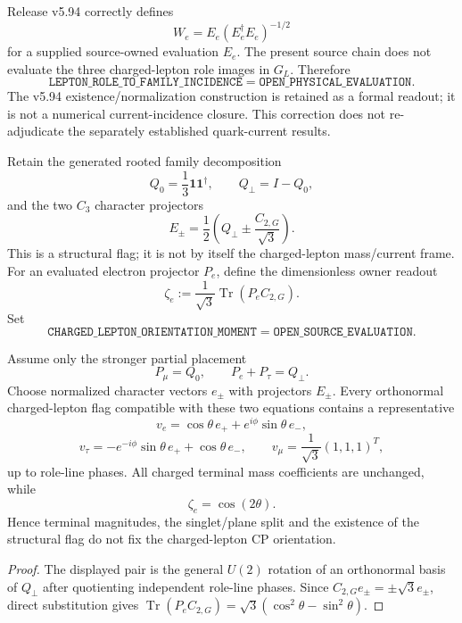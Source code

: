 \documentclass[12pt,a4paper]{article}
\begin{document}
\begin{corollary}
\label{p6:cor:v595-we-formal-open-evaluation}
Release v5.94 correctly defines
\[
 W_e=E_e(E_e^\dagger E_e)^{-1/2}
\]
for a supplied source-owned evaluation $E_e$.  The present source chain does
not evaluate the three charged-lepton role images in $G_L$.  Therefore
\[
 \boxed{
 \texttt{LEPTON\_ROLE\_TO\_FAMILY\_INCIDENCE}
 =\texttt{OPEN\_PHYSICAL\_EVALUATION}.}
\]
The v5.94 existence/normalization construction is retained as a formal
readout; it is not a numerical current-incidence closure.  This correction
does not re-adjudicate the separately established quark-current results.
\end{corollary}

\begin{definition}
\label{p6:def:v595-lepton-orientation-moment}
Retain the generated rooted family decomposition
\[
 Q_0=\frac13\mathbf1\mathbf1^\dagger,\qquad
 Q_\perp=I-Q_0,
\]
and the two $C_3$ character projectors
\[
 E_\pm=\frac12\left(Q_\perp\pm\frac{C_{2,G}}{\sqrt3}\right).
\]
This is a structural flag; it is not by itself the charged-lepton mass/current
frame.  For an evaluated electron projector $P_e$, define the dimensionless
owner readout
\[
 \boxed{\zeta_e:=\frac1{\sqrt3}\operatorname{Tr}(P_eC_{2,G}).}
\]
Set
\[
 \boxed{
 \texttt{CHARGED\_LEPTON\_ORIENTATION\_MOMENT}
 =\texttt{OPEN\_SOURCE\_EVALUATION}.}
\]
\end{definition}

\begin{theorem}
\label{p6:thm:v595-lepton-inplane-counterfamily}
Assume only the stronger partial placement
\[
 P_\mu=Q_0,\qquad P_e+P_\tau=Q_\perp.
\]
Choose normalized character vectors $e_\pm$ with projectors $E_\pm$.  Every
orthonormal charged-lepton flag compatible with these two equations contains
a representative
\[
 v_e=\cos\theta\,e_+ +e^{i\phi}\sin\theta\,e_-,
\]
\[
 v_\tau=-e^{-i\phi}\sin\theta\,e_+ +\cos\theta\,e_-,
\qquad
 v_\mu=\frac1{\sqrt3}(1,1,1)^T,
\]
up to role-line phases.  All charged terminal mass coefficients are unchanged,
while
\[
 \boxed{\zeta_e=\cos(2\theta).}
\]
Hence terminal magnitudes, the singlet/plane split and the existence of the
structural flag do not fix the charged-lepton CP orientation.
\end{theorem}

\begin{proof}
The displayed pair is the general $U(2)$ rotation of an orthonormal basis of
$Q_\perp$ after quotienting independent role-line phases.  Since
$C_{2,G}e_\pm=\pm\sqrt3e_\pm$, direct substitution gives
$\operatorname{Tr}(P_eC_{2,G})=\sqrt3(\cos^2\theta-\sin^2\theta)$.
\end{proof}
\end{document}
